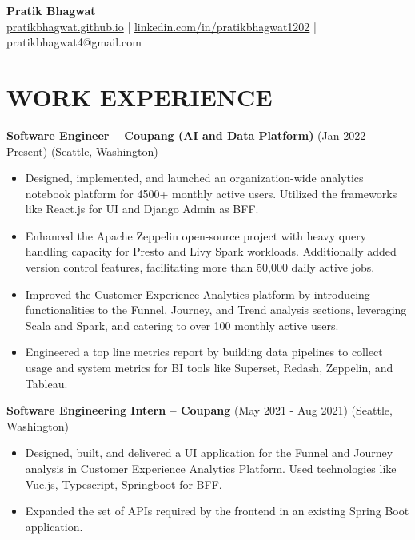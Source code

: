 \documentclass[a4paper,10pt]{article}
\begin{document}
\begin{center}
    {\LARGE \textbf{Pratik Bhagwat}} \\ 
    \smallskip
    \href{https://pratikbhagwat.github.io}{pratikbhagwat.github.io} |
    \href{https://linkedin.com/in/pratikbhagwat1202}{linkedin.com/in/pratikbhagwat1202} |
    pratikbhagwat4@gmail.com
\end{center}

\section*{\textbf{WORK EXPERIENCE}}

\noindent\textbf{Software Engineer – Coupang (AI and Data Platform)} (Jan 2022 - Present) (Seattle, Washington)
\begin{itemize}[noitemsep, topsep=0pt]
    \item Designed, implemented, and launched an organization-wide analytics notebook platform for 4500+ monthly active users. Utilized the frameworks like React.js for UI and Django Admin as BFF.
    \item Enhanced the Apache Zeppelin open-source project with heavy query handling capacity for Presto and Livy Spark workloads. Additionally added version control features, facilitating more than 50,000 daily active jobs.
    \item Improved the Customer Experience Analytics platform by introducing functionalities to the Funnel, Journey, and Trend analysis sections, leveraging Scala and Spark, and catering to over 100 monthly active users.
    \item Engineered a top line metrics report by building data pipelines to collect usage and system metrics for BI tools like Superset, Redash, Zeppelin, and Tableau.
\end{itemize}

\noindent\textbf{Software Engineering Intern – Coupang} (May 2021 - Aug 2021)  (Seattle, Washington)
\begin{itemize}[noitemsep, topsep=0pt]
    \item Designed, built, and delivered a UI application for the Funnel and Journey analysis in Customer Experience Analytics Platform. Used technologies like Vue.js, Typescript, Springboot for BFF.
    \item Expanded the set of APIs required by the frontend in an existing Spring Boot application.
\end{itemize}
\end{document}
